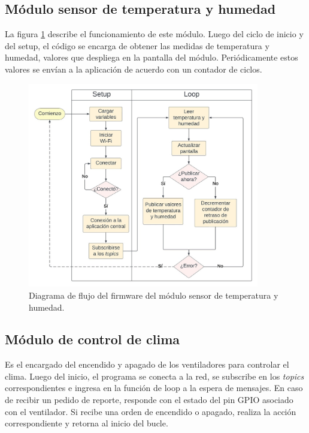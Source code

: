 \pagebreak
\subsection{Módulo sensor de temperatura y humedad}
\label{Firmware módulo sensor de temperatura y humedad}

La figura \ref{fig:flow_tempsensor} describe el funcionamiento de este módulo. Luego del ciclo de inicio y del setup, el código se encarga de obtener las medidas de temperatura y humedad, valores que despliega en la pantalla del módulo. Periódicamente estos valores se envían a la aplicación de acuerdo con un contador de ciclos. 


\begin{figure}[!h]
	\centering
	\includegraphics[width=0.9\textwidth]{./Figures/chapter3/FirmwareTempSensor.jpg}
	\caption[Diagrama de flujo del firmware del módulo sensor de temperatura y humedad]{Diagrama de flujo del firmware del módulo sensor de temperatura y humedad.}
	\label{fig:flow_tempsensor}
\end{figure}




\subsection{Módulo de control de clima}
\label{Firmware módulo de control de clima}

Es el encargado del encendido y apagado de los ventiladores para controlar el clima.
Luego del inicio, el programa se conecta a la red, se subscribe en los \textit{topics} correspondientes e ingresa en la función de loop a la espera de mensajes. En caso de recibir un pedido de reporte, responde con el estado del pin GPIO asociado con el ventilador. Si recibe una orden de encendido o apagado, realiza la acción correspondiente y retorna al inicio del bucle.

